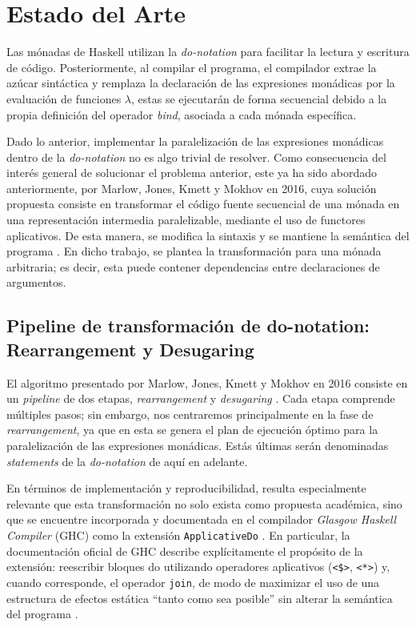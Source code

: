 \section{Estado del Arte}\label{sec:estado_del_arte}

Las mónadas de \textsf{Haskell} utilizan la \textit{do-notation} para facilitar la lectura y escritura de código. Posteriormente, al compilar el programa, el compilador extrae la azúcar sintáctica y remplaza la declaración de las expresiones monádicas por la evaluación de funciones $\lambda$, estas se ejecutarán de forma secuencial debido a la propia definición del operador \textit{bind}, asociada a cada mónada específica. 

Dado lo anterior, implementar la paralelización de las expresiones monádicas dentro de la \textit{do-notation} no es algo trivial de resolver. Como consecuencia del interés general de solucionar el problema anterior, este ya ha sido abordado anteriormente, por Marlow, Jones, Kmett y Mokhov en 2016, cuya solución propuesta consiste en transformar el código fuente secuencial de una mónada en una representación intermedia paralelizable, mediante el uso de functores aplicativos. De esta manera, se modifica la sintaxis y se mantiene la semántica del programa \cite{MarlowPJKM2016}. En dicho trabajo, se plantea la transformación para una mónada arbitraria; es decir, esta puede contener dependencias entre declaraciones de argumentos.

\subsection{Pipeline de transformación de do-notation: Rearrangement y Desugaring}\label{sec:sa}

El algoritmo presentado por Marlow, Jones, Kmett y Mokhov en 2016 consiste en un \textit{pipeline} de dos etapas,  \textit{rearrangement} y \textit{desugaring} \cite[p.~96]{MarlowPJKM2016}. Cada etapa comprende múltiples pasos; sin embargo, nos centraremos principalmente en la fase de \textit{rearrangement}, ya que en esta se genera el plan de ejecución óptimo para la paralelización de las expresiones monádicas. Estás últimas serán denominadas \textit{statements} de la \textit{do-notation} de aquí en adelante.

En términos de implementación y reproducibilidad, resulta especialmente relevante que esta transformación no solo exista como propuesta académica, sino que se encuentre incorporada y documentada en el compilador \textit{Glasgow Haskell Compiler} (\textsf{GHC}) como la extensión \texttt{ApplicativeDo} \cite{marlow_ado}. En particular, la documentación oficial de \textsf{GHC} describe explícitamente el propósito de la extensión: reescribir bloques do utilizando operadores aplicativos (\texttt{<\$>}, \texttt{<*>}) y, cuando corresponde, el operador \texttt{join}, de modo de maximizar el uso de una estructura de efectos estática ``tanto como sea posible'' sin alterar la semántica del programa \cite{MarlowPJKM2016}.

